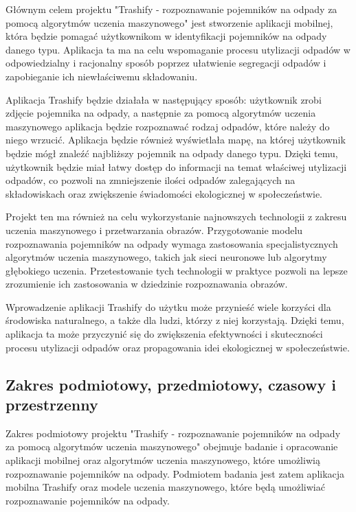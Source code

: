 \documentclass[12pt,oneside]{book}
\begin{document}
Głównym celem projektu "Trashify - rozpoznawanie pojemników na odpady za pomocą algorytmów uczenia maszynowego" jest stworzenie aplikacji mobilnej, która będzie pomagać użytkownikom w identyfikacji pojemników na odpady danego typu. Aplikacja ta ma na celu wspomaganie procesu utylizacji odpadów w odpowiedzialny i racjonalny sposób poprzez ułatwienie segregacji odpadów i zapobieganie ich niewłaściwemu składowaniu.

Aplikacja Trashify będzie działała w następujący sposób: użytkownik zrobi zdjęcie pojemnika na odpady, a następnie za pomocą algorytmów uczenia maszynowego aplikacja będzie rozpoznawać rodzaj odpadów, które należy do niego wrzucić. Aplikacja będzie również wyświetlała mapę, na której użytkownik będzie mógł znaleźć najbliższy pojemnik na odpady danego typu. Dzięki temu, użytkownik będzie miał łatwy dostęp do informacji na temat właściwej utylizacji odpadów, co pozwoli na zmniejszenie ilości odpadów zalegających na składowiskach oraz zwiększenie świadomości ekologicznej w społeczeństwie.

Projekt ten ma również na celu wykorzystanie najnowszych technologii z zakresu uczenia maszynowego i przetwarzania obrazów. Przygotowanie modelu rozpoznawania pojemników na odpady wymaga zastosowania specjalistycznych algorytmów uczenia maszynowego, takich jak sieci neuronowe lub algorytmy głębokiego uczenia. Przetestowanie tych technologii w praktyce pozwoli na lepsze zrozumienie ich zastosowania w dziedzinie rozpoznawania obrazów.

Wprowadzenie aplikacji Trashify do użytku może przynieść wiele korzyści dla środowiska naturalnego, a także dla ludzi, którzy z niej korzystają. Dzięki temu, aplikacja ta może przyczynić się do zwiększenia efektywności i skuteczności procesu utylizacji odpadów oraz propagowania idei ekologicznej w społeczeństwie.

\subsection{Zakres podmiotowy, przedmiotowy, czasowy i przestrzenny}

Zakres podmiotowy projektu "Trashify - rozpoznawanie pojemników na odpady za pomocą algorytmów uczenia maszynowego" obejmuje badanie i opracowanie aplikacji mobilnej oraz algorytmów uczenia maszynowego, które umożliwią rozpoznawanie pojemników na odpady. Podmiotem badania jest zatem aplikacja mobilna Trashify oraz modele uczenia maszynowego, które będą umożliwiać rozpoznawanie pojemników na odpady.
\end{document}
